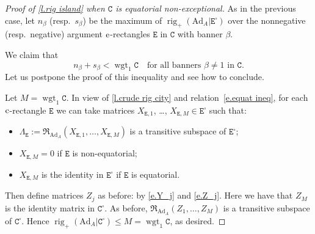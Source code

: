 \documentclass[10pt, a4paper]{amsart}
\theoremstyle{plain}
\theoremstyle{definition}
\theoremstyle{remark}
\theoremstyle{note}
\numberwithin{equation}{section}
\begin{document}
\begin{proof}[Proof of \cref{l.rig island} when ${\mathtt{C}}$ is equatorial non-exceptional]
As in the previous case,  
let $n_\beta$ (resp.\ $s_\beta$) be the maximum of 
$\operatorname{rig}_+({\mathrm{Ad}}_A|{\mathtt{E}}^\square)$ over the nonnegative (resp.\ negative)  argument $\rm e$-rectangles ${\mathtt{E}}$ in ${\mathtt{C}}$ with banner $\beta$.

We claim that 
\begin{equation}\label{e.equat ineq}
n_\beta + s_\beta < \operatorname{wgt}_1 {\mathtt{C}} \quad \text{for all banners $\beta \neq 1$ in ${\mathtt{C}}$.}
\end{equation}
Let us postpone the proof of this inequality and see how to conclude.

Let $M=\operatorname{wgt}_1 {\mathtt{C}}$.
In view of \cref{l.crude rig city} and relation~\eqref{e.equat ineq},
for each $\rm c$-rectangle ${\mathtt{E}}$ we can take matrices $X_{{\mathtt{E}}, 1}$, \dots, $X_{{\mathtt{E}}, M} \in {\mathtt{E}}^\square$
such that:
\begin{itemize}
\item $\Lambda_{\mathtt{E}} := {\mathfrak{R}}_{{\mathrm{Ad}}_A} (X_{{\mathtt{E}}, 1}, \dots, X_{{\mathtt{E}}, M})$ is a transitive subspace of  ${\mathtt{E}}^\square$;
\item $X_{{\mathtt{E}}, M} = 0$ if ${\mathtt{E}}$ is non-equatorial;
\item $X_{{\mathtt{E}}, M}$ is the identity in ${\mathtt{E}}^\square$ if ${\mathtt{E}}$ is equatorial.
\end{itemize}
Then define matrices $Z_j$ as before: by \eqref{e.Y_j} and \eqref{e.Z_j}.
Here we have that $Z_M$ is the identity matrix in ${\mathtt{C}}^\square$.
As before, ${\mathfrak{R}}_{{\mathrm{Ad}}_A}(Z_1, \dots, Z_M)$ is a transitive subspace of ${\mathtt{C}}^\square$.
Hence $\operatorname{rig}_+({\mathrm{Ad}}_A|{\mathtt{C}}^\square) \le M = \operatorname{wgt}_1 {\mathtt{C}}$, as desired.

\medskip


\end{proof}
\end{document}
